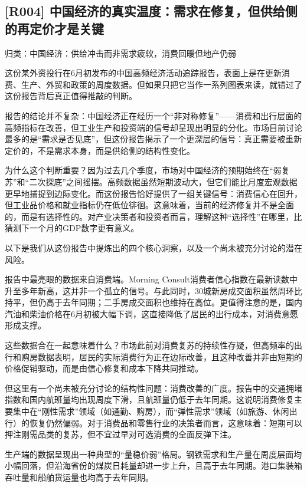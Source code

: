 \documentclass[11pt]{ctexart}
\begin{document}
\subsection{[R004] 中国经济的真实温度：需求在修复，但供给侧的再定价才是关键}
{\small\color{refgray}归类：中国经济：供给冲击而非需求疲软，消费回暖但地产仍弱}

这份某外资投行在6月初发布的中国高频经济活动追踪报告，表面上是在更新消费、生产、外贸和政策的周度数据。但如果只把它当作一系列图表来读，就错过了这份报告背后真正值得推敲的判断。

报告的结论并不复杂：中国经济正在经历一个“非对称修复”——消费和出行层面的高频指标在改善，但工业生产和投资端的信号却呈现出明显的分化。市场目前讨论最多的是“需求是否见底”，但这份报告揭示了一个更深层的信号：真正需要被重新定价的，不是需求本身，而是供给侧的结构性变化。

为什么这个判断重要？因为过去几个季度，市场对中国经济的预期始终在“弱复苏”和“二次探底”之间摇摆。高频数据虽然短期波动大，但它们能比月度宏观数据更早地捕捉到边际变化。而这份报告恰好提供了一组关键信号：消费信心在回升，但工业品价格和就业指标仍在低位徘徊。这意味着，当前的经济修复并不是全面的，而是有选择性的。对产业决策者和投资者而言，理解这种“选择性”在哪里，比猜测下一个月的GDP数字更有意义。

以下是我们从这份报告中提炼出的四个核心洞察，以及一个尚未被充分讨论的潜在风险。

报告中最亮眼的数据来自消费端。Morning Consult消费者信心指数在最新读数中升至多年新高，这并非一个孤立的信号。与此同时，30城新房成交面积虽然周环比持平，但仍高于去年同期；二手房成交面积也维持在高位。更值得注意的是，国内汽油和柴油价格在6月初被大幅下调，这直接降低了居民的出行成本，对消费意愿形成支撑。

这些数据合在一起意味着什么？市场此前对消费复苏的持续性存疑，但高频率的出行和购房数据表明，居民的实际消费行为正在边际改善，且这种改善并非由短期的价格促销驱动，而是由信心修复和成本下降共同推动。

但这里有一个尚未被充分讨论的结构性问题：消费改善的广度。报告中的交通拥堵指数和国内航班量均出现周度下滑，且航班量仍低于去年同期。这说明消费修复主要集中在“刚性需求”领域（如通勤、购房），而“弹性需求”领域（如旅游、休闲出行）的恢复仍然偏弱。对于消费品和零售行业的决策者而言，这意味着：短期可以押注刚需品类的复苏，但不宜过早对可选消费的全面反弹下注。

生产端的数据呈现出一种典型的“量稳价弱”格局。钢铁需求和生产量在周度层面均小幅回落，但沿海省份的煤炭日耗量却进一步上升，且高于去年同期。港口集装箱吞吐量和船舶货运量也均高于去年同期。
\end{document}
